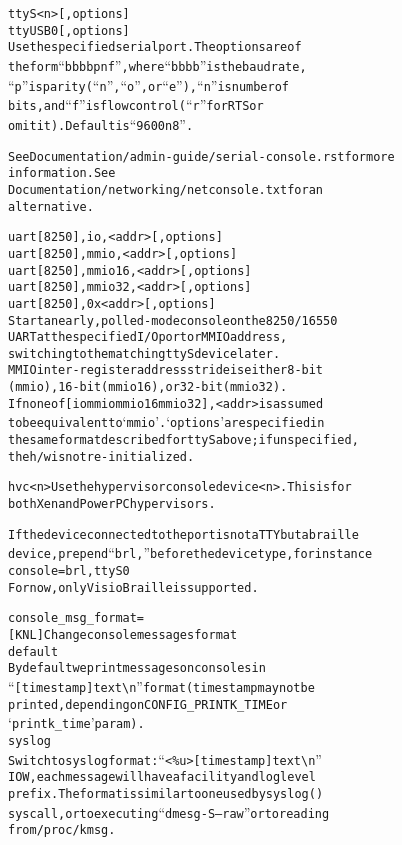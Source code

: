 \documentclass[a4paper,8pt,english]{sphinxmanual}
\begin{document}
\begin{alltt}
                ttyS\textless{}n\textgreater{}{[},options{]}
                ttyUSB0{[},options{]}
                        Use the specified serial port.  The options are of
                        the form ``bbbbpnf'', where ``bbbb'' is the baud rate,
                        ``p'' is parity (``n'', ``o'', or ``e''), ``n'' is number of
                        bits, and ``f'' is flow control (``r'' for RTS or
                        omit it).  Default is ``9600n8''.

                        See Documentation/admin-guide/serial-console.rst for more
                        information.  See
                        Documentation/networking/netconsole.txt for an
                        alternative.

                uart{[}8250{]},io,\textless{}addr\textgreater{}{[},options{]}
                uart{[}8250{]},mmio,\textless{}addr\textgreater{}{[},options{]}
                uart{[}8250{]},mmio16,\textless{}addr\textgreater{}{[},options{]}
                uart{[}8250{]},mmio32,\textless{}addr\textgreater{}{[},options{]}
                uart{[}8250{]},0x\textless{}addr\textgreater{}{[},options{]}
                        Start an early, polled-mode console on the 8250/16550
                        UART at the specified I/O port or MMIO address,
                        switching to the matching ttyS device later.
                        MMIO inter-register address stride is either 8-bit
                        (mmio), 16-bit (mmio16), or 32-bit (mmio32).
                        If none of {[}io\textbar{}mmio\textbar{}mmio16\textbar{}mmio32{]}, \textless{}addr\textgreater{} is assumed
                        to be equivalent to `mmio'. `options' are specified in
                        the same format described for ttyS above; if unspecified,
                        the h/w is not re-initialized.

                hvc\textless{}n\textgreater{}  Use the hypervisor console device \textless{}n\textgreater{}. This is for
                        both Xen and PowerPC hypervisors.

                If the device connected to the port is not a TTY but a braille
                device, prepend ``brl,'' before the device type, for instance
                        console=brl,ttyS0
                For now, only VisioBraille is supported.

        console\_msg\_format=
                        {[}KNL{]} Change console messages format
                default
                        By default we print messages on consoles in
                        ``{[}time stamp{]} text\textbackslash{}n'' format (time stamp may not be
                        printed, depending on CONFIG\_PRINTK\_TIME or
                        {}`printk\_time' param).
                syslog
                        Switch to syslog format: ``\textless{}\%u\textgreater{}{[}time stamp{]} text\textbackslash{}n''
                        IOW, each message will have a facility and loglevel
                        prefix. The format is similar to one used by syslog()
                        syscall, or to executing ``dmesg -S --raw'' or to reading
                        from /proc/kmsg.


\end{alltt}
\end{document}
